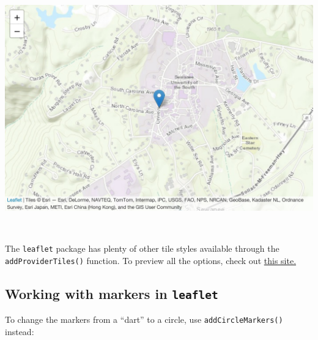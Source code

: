 \documentclass[
]{book}
\newenvironment{Shaded}{\begin{snugshade}}{\end{snugshade}}
\newcommand{\AttributeTok}[1]{\textcolor[rgb]{0.77,0.63,0.00}{#1}}
\newcommand{\DecValTok}[1]{\textcolor[rgb]{0.00,0.00,0.81}{#1}}
\newcommand{\FunctionTok}[1]{\textcolor[rgb]{0.00,0.00,0.00}{#1}}
\newcommand{\NormalTok}[1]{#1}
\newcommand{\SpecialCharTok}[1]{\textcolor[rgb]{0.00,0.00,0.00}{#1}}
\newcommand{\StringTok}[1]{\textcolor[rgb]{0.31,0.60,0.02}{#1}}
\begin{document}
\includegraphics[width=694.08px]{figures/unnamed-chunk-224-1}

~

The \texttt{leaflet} package has plenty of other tile styles available through the \texttt{addProviderTiles()} function. To preview all the options, check out \href{https://leaflet-extras.github.io/leaflet-providers/preview/}{this site.}

\hypertarget{working-with-markers-in-leaflet}{%
\subsection*{\texorpdfstring{Working with markers in \texttt{leaflet}}{Working with markers in leaflet}}\label{working-with-markers-in-leaflet}}

To change the markers from a ``dart'' to a circle, use \texttt{addCircleMarkers()} instead:

\begin{Shaded}
\end{Shaded}
\end{document}
